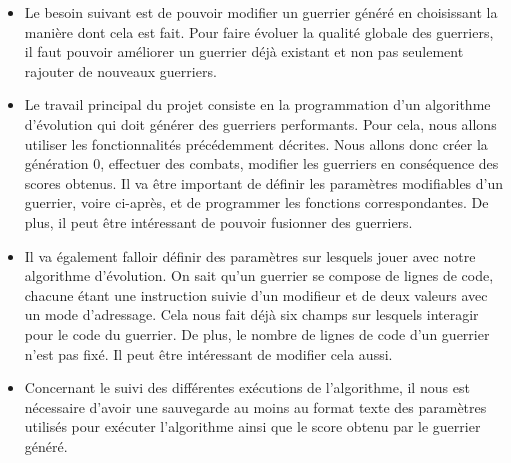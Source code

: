 \documentclass[french]{article}
\begin{document}
\begin{itemize}
            \item Le besoin suivant est de pouvoir modifier un guerrier généré en choisissant la manière dont cela est fait. Pour faire évoluer la qualité globale des guerriers, il faut pouvoir améliorer un guerrier déjà existant et non pas seulement rajouter de nouveaux guerriers. \\
            
            \item Le travail principal du projet consiste en la programmation d’un algorithme d’évolution qui doit générer des guerriers performants. Pour cela, nous allons utiliser les fonctionnalités précédemment décrites. Nous allons donc créer la génération 0, effectuer des combats, modifier les guerriers en conséquence des scores obtenus. Il va être important de définir les paramètres modifiables d’un guerrier, voire ci-après, et de programmer les fonctions correspondantes. De plus, il peut être intéressant de pouvoir fusionner des guerriers. \\
            
            \item Il va également falloir définir des paramètres sur lesquels jouer avec notre algorithme d’évolution. On sait qu’un guerrier se compose de lignes de code, chacune étant une instruction suivie d’un modifieur et de deux valeurs avec un mode d’adressage. Cela nous fait déjà six champs sur lesquels interagir pour le code du guerrier. De plus, le nombre de lignes de code d’un guerrier n’est pas fixé. Il peut être intéressant de modifier cela aussi. \\
            
            \item Concernant le suivi des différentes exécutions de l'algorithme, il nous est nécessaire d'avoir une sauvegarde au moins au format texte des paramètres utilisés pour exécuter l'algorithme ainsi que le score obtenu par le guerrier généré.\\
        \end{itemize}
\end{document}
